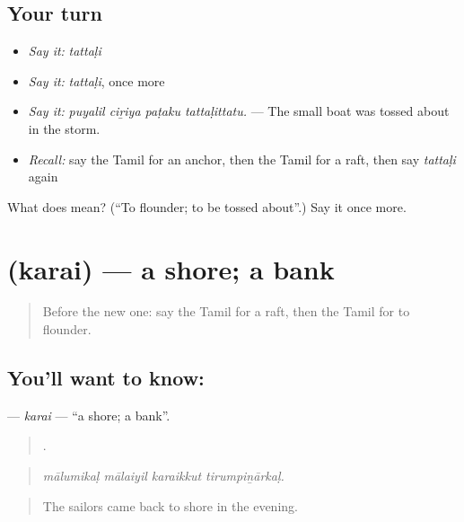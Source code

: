 \subsection*{Your turn}
\begin{itemize}
\raggedright
  \item \emph{Say it:} \emph{tattaḷi}
  \item \emph{Say it:} \emph{tattaḷi}, once more
  \item \emph{Say it:} \emph{puyalil ciṟiya paṭaku tattaḷittatu.} — The small boat was tossed about in the storm.
  \item \emph{Recall:} say the Tamil for an anchor, then the Tamil for a raft, then say \emph{tattaḷi} again
\end{itemize}

\begin{tcolorbox}[breakable,colback=teal!4,colframe=teal!35!black,title={Before you move on}]
What does  mean? (\textquotedblleft{}To flounder; to be tossed about\textquotedblright{}.) Say it once more.
\end{tcolorbox}
\section[\texorpdfstring{\ta{கரை} (karai)}{கரை (karai)}]{ (karai) — a shore; a bank}

\label{lesson:TA-C417-karai}



\begin{quote}
Before the new one: say the Tamil for a raft, then the Tamil for to flounder.
\end{quote}

\subsection*{You'll want to know: }
\textbf{} — \emph{karai} — \textquotedblleft{}a shore; a bank\textquotedblright{}.

\begin{quote}
   .
\end{quote}

\begin{quote}
\emph{mālumikaḷ mālaiyil karaikkut tirumpiṉārkaḷ.}
\end{quote}

\begin{quote}
The sailors came back to shore in the evening.
\end{quote}

